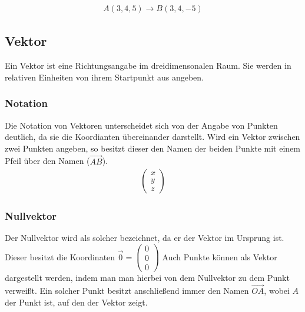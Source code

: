 \begin{beispiel}
\begin{align*}
	A(3,4,5) \rightarrow B(3,4,-5)
\end{align*}
\end{beispiel}
\subsection{Vektor}
Ein Vektor ist eine Richtungsangabe im dreidimensonalen Raum. Sie werden in relativen Einheiten von ihrem Startpunkt aus angeben. 
\begin{figure}[h]

\end{figure}
\subsubsection{Notation}
Die Notation von Vektoren unterscheidet sich von der Angabe von Punkten deutlich, da sie die Koordianten übereinander darstellt. Wird ein Vektor zwischen zwei Punkten angeben, so besitzt dieser den Namen der beiden Punkte mit einem Pfeil über den Namen ($\vec{AB}$). 
\begin{align*}
\begin{pmatrix} x \\ y\\ z \end{pmatrix}
\end{align*}
\subsubsection{Nullvektor}
Der Nullvektor wird als solcher bezeichnet, da er der Vektor im Ursprung ist. Dieser besitzt die Koordinaten $\vec{0}=\begin{pmatrix} 0 \\ 0\\ 0 \end{pmatrix}$ Auch Punkte können als Vektor dargestellt werden, indem man man hierbei von dem Nullvektor zu dem Punkt verweißt. Ein solcher Punkt besitzt anschließend immer den Namen $\vec{OA}$, wobei $A$ der Punkt ist, auf den der Vektor zeigt.
